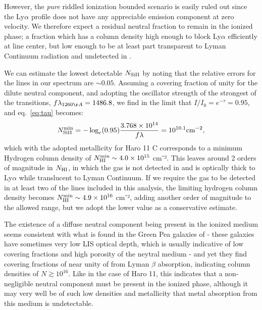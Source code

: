 \documentclass[twocolumn]{aastex61}
\begin{document}
However, the \emph{pure} riddled ionization bounded scenario is easily
ruled out since the Ly$\alpha$ profile does not have any appreciable
emission component at zero velocity. We therefore expect a residual
neutral fraction to remain in the ionized phase; a fraction which has a
column density high enough to block Ly$\alpha$ efficiently at line
center, but low enough to be at least part transparent to Lyman
Continuum radiation and undetected in .

We can estimate the lowest detectable $N_{\rm Si II}$ by noting that the
relative errors for the  lines in our spectrum are
$\sim 0.05$. Assuming a covering fraction of unity for the dilute
neutral component, and adopting the oscillator strength of the strongest
of the  transitions, $f\lambda_{1260 \AA} = 1486.8$, we find
in the limit that $I/I_0 = e^{-\tau} = 0.95$, and eq.~\ref{eq:tau}
becomes:
%
\begin{equation}
\label{eq:silim}
N_{\rm Si II}^{\rm min} = -\log_{e}(0.95) \frac{3.768 \times 10^{14}}{f\lambda} 
    = 10^{10.1} \text{cm}^{-2},
\end{equation}
%
 which with the adopted metallicity for Haro 11 C corresponds to a
minimum Hydrogen column density of
$N_{\rm HI}^{\rm min} \sim 4.0 \times 10^{15}$ cm⁻². This leaves around
2 orders of magnitude in $N_{\rm H I}$, in which the gas is not detected
in  and is optically thick to Ly$\alpha$ while translucent to
Lyman Continuum. If we require the gas to be detected in at least two of
the lines included in this analysis, the limiting hydrogen column
density becomes $N_{\rm HI}^{\rm min} \sim 4.9 \times 10^{16}$ cm⁻²,
adding another order of magnitude to the allowed range, but we adopt the
lower value as a conservative estimate.

The existence of a diffuse neutral component being present in the
ionized medium seems consistent with what is found in the Green Pea
galaxies of \citep{Henry2015} - these galaxies have sometimes very low
LIS optical depth, which is usually indicative of low covering fractions
and high porosity of the neytral medium - and yet they find covering
fractions of near unity of  from Lyman $\beta$ absorption,
indicating column densities of $N \gtrsim 10^{16}$. Like in the case of
Haro 11, this indicates that a non-negligible neutral component must be
present in the ionized phase, although it may very well be of such low
densities and metallicity that metal absorption from this medium is
undetectable.
\end{document}

